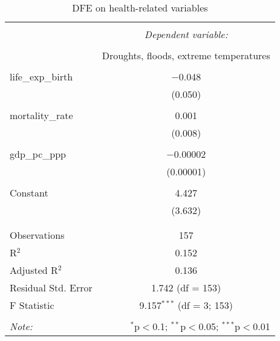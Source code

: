 
\begin{table}[!htbp] \centering 
  \caption{DFE on health-related variables} 
  \label{} 
\begin{tabular}{@{\extracolsep{5pt}}lc} 
\\[-1.8ex]\hline 
\hline \\[-1.8ex] 
 & \multicolumn{1}{c}{\textit{Dependent variable:}} \\ 
\cline{2-2} 
\\[-1.8ex] & Droughts, floods, extreme temperatures \\ 
\hline \\[-1.8ex] 
 life\_exp\_birth & $-$0.048 \\ 
  & (0.050) \\ 
  & \\ 
 mortality\_rate & 0.001 \\ 
  & (0.008) \\ 
  & \\ 
 gdp\_pc\_ppp & $-$0.00002 \\ 
  & (0.00001) \\ 
  & \\ 
 Constant & 4.427 \\ 
  & (3.632) \\ 
  & \\ 
\hline \\[-1.8ex] 
Observations & 157 \\ 
R$^{2}$ & 0.152 \\ 
Adjusted R$^{2}$ & 0.136 \\ 
Residual Std. Error & 1.742 (df = 153) \\ 
F Statistic & 9.157$^{***}$ (df = 3; 153) \\ 
\hline 
\hline \\[-1.8ex] 
\textit{Note:}  & \multicolumn{1}{r}{$^{*}$p$<$0.1; $^{**}$p$<$0.05; $^{***}$p$<$0.01} \\ 
\end{tabular} 
\end{table} 
